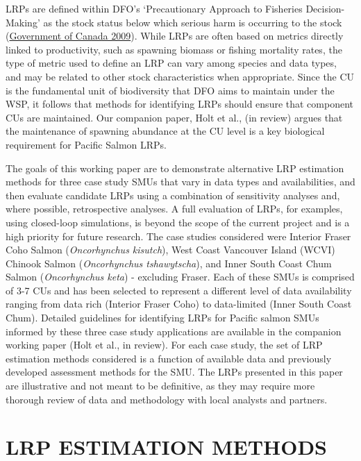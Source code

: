 \documentclass[11pt]{book}
\begin{document}
LRPs are defined within DFO's `Precautionary Approach to Fisheries Decision-Making' as the stock status below which serious harm is occurring to the stock (\protect\hyperlink{ref-governmentofcanadaFisheryDecisionmakingFramework2009}{Government of Canada 2009}). While LRPs are often based on metrics directly linked to productivity, such as spawning biomass or fishing mortality rates, the type of metric used to define an LRP can vary among species and data types, and may be related to other stock characteristics when appropriate. Since the CU is the fundamental unit of biodiversity that DFO aims to maintain under the WSP, it follows that methods for identifying LRPs should ensure that component CUs are maintained. Our companion paper, Holt et al., (in review) argues that the maintenance of spawning abundance at the CU level is a key biological requirement for Pacific Salmon LRPs.

The goals of this working paper are to demonstrate alternative LRP estimation methods for three case study SMUs that vary in data types and availabilities, and then evaluate candidate LRPs using a combination of sensitivity analyses and, where possible, retrospective analyses. A full evaluation of LRPs, for examples, using closed-loop simulations, is beyond the scope of the current project and is a high priority for future research. The case studies considered were Interior Fraser Coho Salmon (\emph{Oncorhynchus kisutch}), West Coast Vancouver Island (WCVI) Chinook Salmon (\emph{Oncorhynchus tshawytscha}), and Inner South Coast Chum Salmon (\emph{Oncorhynchus keta}) - excluding Fraser. Each of these SMUs is comprised of 3-7 CUs and has been selected to represent a different level of data availability ranging from data rich (Interior Fraser Coho) to data-limited (Inner South Coast Chum). Detailed guidelines for identifying LRPs for Pacific salmon SMUs informed by these three case study applications are available in the companion working paper (Holt et al., in review). For each case study, the set of LRP estimation methods considered is a function of available data and previously developed assessment methods for the SMU. The LRPs presented in this paper are illustrative and not meant to be definitive, as they may require more thorough review of data and methodology with local analysts and partners.

\hypertarget{MethodsChapter}{%
\section{LRP ESTIMATION METHODS}\label{MethodsChapter}}
\end{document}
